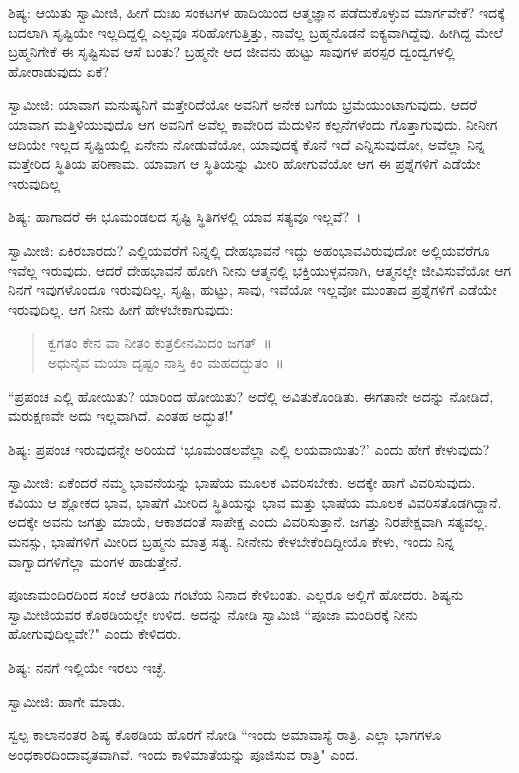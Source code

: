 ಶಿಷ್ಯ: ಆಯಿತು ಸ್ವಾಮೀಜಿ, ಹೀಗೆ ದುಃಖ ಸಂಕಟಗಳ ಹಾದಿಯಿಂದ ಆತ್ಮಜ್ಞಾನ ಪಡೆದುಕೊಳ್ಳುವ ಮಾರ್ಗವೇಕೆ? ಇದಕ್ಕೆ ಬದಲಾಗಿ ಸೃಷ್ಟಿಯೇ ಇಲ್ಲದಿದ್ದಲ್ಲಿ ಎಲ್ಲವೂ ಸರಿಹೋಗುತ್ತಿತ್ತು, ನಾವೆಲ್ಲ ಬ್ರಹ್ಮನೊಡನೆ ಐಕ್ಯವಾಗಿದ್ದೆವು. ಹೀಗಿದ್ದ ಮೇಲೆ ಬ್ರಹ್ಮನಿಗೇಕೆ ಈ ಸೃಷ್ಟಿಸುವ ಆಸೆ ಬಂತು? ಬ್ರಹ್ಮನೇ ಆದ ಜೀವನು ಹುಟ್ಟು ಸಾವುಗಳ ಪರಸ್ಪರ ದ್ವಂದ್ವಗಳಲ್ಲಿ ಹೋರಾಡುವುದು ಏಕೆ?

ಸ್ವಾಮೀಜಿ: ಯಾವಾಗ ಮನುಷ್ಯನಿಗೆ ಮತ್ತೇರಿದೆಯೋ ಅವನಿಗೆ ಅನೇಕ ಬಗೆಯ ಭ್ರಮೆಯುಂಟಾಗುವುದು. ಆದರೆ ಯಾವಾಗ ಮತ್ತಿಳಿಯುವುದೊ ಆಗ ಅವನಿಗೆ ಅವೆಲ್ಲ ಕಾವೇರಿದ ಮೆದುಳಿನ ಕಲ್ಪನೆಗಳೆಂದು ಗೊತ್ತಾಗುವುದು. ನೀನೀಗ ಆದಿಯೇ ಇಲ್ಲದ ಸೃಷ್ಟಿಯಲ್ಲಿ ಏನೇನು ನೋಡುವೆಯೋ, ಯಾವುದಕ್ಕೆ ಕೊನೆ ಇದೆ ಎನ್ನಿಸುವುದೋ, ಅವೆಲ್ಲಾ ನಿನ್ನ ಮತ್ತೇರಿದ ಸ್ಥಿತಿಯ ಪರಿಣಾಮ. ಯಾವಾಗ ಆ ಸ್ಥಿತಿಯನ್ನು ಮೀರಿ ಹೋಗುವೆಯೋ ಆಗ ಈ ಪ್ರಶ್ನೆಗಳಿಗೆ ಎಡೆಯೇ ಇರುವುದಿಲ್ಲ

ಶಿಷ್ಯ: ಹಾಗಾದರೆ ಈ ಭೂಮಂಡಲದ ಸೃಷ್ಟಿ ಸ್ಥಿತಿಗಳಲ್ಲಿ ಯಾವ ಸತ್ಯವೂ ಇಲ್ಲವೆ?~।

ಸ್ವಾಮೀಜಿ: ಏಕಿರಬಾರದು? ಎಲ್ಲಿಯವರೆಗೆ ನಿನ್ನಲ್ಲಿ ದೇಹಭಾವನೆ ಇದ್ದು ಅಹಂಭಾವವಿರುವುದೋ ಅಲ್ಲಿಯವರೆಗೂ ಇವೆಲ್ಲ ಇರುವುದು. ಆದರೆ ದೇಹಭಾವನೆ ಹೋಗಿ ನೀನು ಆತ್ಮನಲ್ಲಿ ಭಕ್ತಿಯುಳ್ಳವನಾಗಿ, ಆತ್ಮನಲ್ಲೇ ಜೀವಿಸುವೆಯೋ ಆಗ ನಿನಗೆ ಇವುಗಳೊಂದೂ ಇರುವುದಿಲ್ಲ. ಸೃಷ್ಟಿ, ಹುಟ್ಟು, ಸಾವು, ಇವೆಯೋ ಇಲ್ಲವೋ ಮುಂತಾದ ಪ್ರಶ್ನೆಗಳಿಗೆ ಎಡೆಯೇ ಇರುವುದಿಲ್ಲ. ಆಗ ನೀನು ಹೀಗೆ ಹೇಳಬೇಕಾಗುವುದು:

\begin{verse}
ಕ್ವಗತಂ ಕೇನ ವಾ ನೀತಂ ಕುತ್ರಲೀನಮಿದಂ ಜಗತ್~॥\\ಅಧುನೈವ ಮಯಾ ದೃಷ್ಟಂ ನಾಸ್ತಿ ಕಿಂ ಮಹದದ್ಭುತಂ~॥
\end{verse}

“ಪ್ರಪಂಚ ಎಲ್ಲಿ ಹೋಯಿತು? ಯಾರಿಂದ ಹೋಯಿತು? ಅದೆಲ್ಲಿ ಅವಿತುಕೊಂಡಿತು. ಈಗತಾನೇ ಅದನ್ನು ನೋಡಿದೆ, ಮರುಕ್ಷಣವೇ ಅದು ಇಲ್ಲವಾಗಿದೆ. ಎಂತಹ ಅದ್ಭುತ!"

ಶಿಷ್ಯ: ಪ್ರಪಂಚ ಇರುವುದನ್ನೇ ಅರಿಯದೆ ‘ಭೂಮಂಡಲವೆಲ್ಲಾ ಎಲ್ಲಿ ಲಯವಾಯಿತು?’ ಎಂದು ಹೇಗೆ ಕೇಳುವುದು?

ಸ್ವಾಮೀಜಿ: ಏಕೆಂದರೆ ನಮ್ಮ ಭಾವನೆಯನ್ನು ಭಾಷೆಯ ಮೂಲಕ ವಿವರಿಸಬೇಕು. ಅದಕ್ಕೇ ಹಾಗೆ ವಿವರಿಸುವುದು. ಕವಿಯು ಆ ಶ್ಲೋಕದ ಭಾವ, ಭಾಷೆಗೆ ಮೀರಿದ ಸ್ಥಿತಿಯನ್ನು ಭಾವ ಮತ್ತು ಭಾಷೆಯ ಮೂಲಕ ವಿವರಿಸತೊಡಗಿದ್ದಾನೆ. ಅದಕ್ಕೇ ಅವನು ಜಗತ್ತು ಮಾಯೆ, ಆಕಾಶದಂತೆ ಸಾಪೇಕ್ಷ ಎಂದು ವಿವರಿಸುತ್ತಾನೆ. ಜಗತ್ತು ನಿರಪೇಕ್ಷವಾಗಿ ಸತ್ಯವಲ್ಲ. ಮನಸ್ಸು, ಭಾಷೆಗಳಿಗೆ ಮೀರಿದ ಬ್ರಹ್ಮನು ಮಾತ್ರ ಸತ್ಯ. ನೀನೇನು ಕೇಳಬೇಕೆಂದಿದ್ದೀಯೊ ಕೇಳು, ಇಂದು ನಿನ್ನ ವಾಗ್ವಾದಗಳಿಗೆಲ್ಲಾ ಮಂಗಳ ಹಾಡುತ್ತೇನೆ.

ಪೂಜಾಮಂದಿರದಿಂದ ಸಂಜೆ ಆರತಿಯ ಗಂಟೆಯ ನಿನಾದ ಕೇಳಿಬಂತು. ಎಲ್ಲರೂ ಅಲ್ಲಿಗೆ ಹೋದರು. ಶಿಷ್ಯನು ಸ್ವಾಮೀಜಿಯವರ ಕೊಠಡಿಯಲ್ಲೇ ಉಳಿದ. ಅದನ್ನು ನೋಡಿ ಸ್ವಾಮಿಜಿ “ಪೂಜಾ ಮಂದಿರಕ್ಕೆ ನೀನು ಹೋಗುವುದಿಲ್ಲವೇ?" ಎಂದು ಕೇಳಿದರು.

ಶಿಷ್ಯ: ನನಗೆ ಇಲ್ಲಿಯೇ ಇರಲು ಇಚ್ಛೆ.

ಸ್ವಾಮೀಜಿ: ಹಾಗೇ ಮಾಡು.

ಸ್ವಲ್ಪ ಕಾಲಾನಂತರ ಶಿಷ್ಯ ಕೊಠಡಿಯ ಹೊರಗೆ ನೋಡಿ “ಇಂದು ಅಮಾವಾಸ್ಯೆ ರಾತ್ರಿ. ಎಲ್ಲಾ ಭಾಗಗಳೂ ಅಂಧಕಾರದಿಂದಾವೃತವಾಗಿವೆ. ಇಂದು ಕಾಳಿಮಾತೆಯನ್ನು ಪೂಜಿಸುವ ರಾತ್ರಿ" ಎಂದ.

